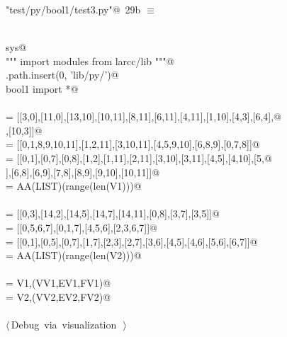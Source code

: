 \documentclass[11pt,oneside]{article}	%
\begin{document}
\begin{flushleft} \small \label{scrap37}
\protect{}\verb@"test/py/bool1/test3.py"@\nobreak\ {\footnotesize 29b }$\equiv$
\vspace{-1ex}
\begin{list}{}{} \item
\mbox{}\verb@@\\
\mbox{}\verb@import sys@\\
\mbox{}\verb@""" import modules from larcc/lib """@\\
\mbox{}\verb@sys.path.insert(0, 'lib/py/')@\\
\mbox{}\verb@from bool1 import *@\\
\mbox{}\verb@@\\
\mbox{} = [[3,0],[11,0],[13,10],[10,11],[8,11],[6,11],[4,11],[1,10],[4,3],[6,4],@\\
\mbox{}\verb@      [8,4],[10,3]]@\\
\mbox{} = [[0,1,8,9,10,11],[1,2,11],[3,10,11],[4,5,9,10],[6,8,9],[0,7,8]]@\\
\mbox{} = [[0,1],[0,7],[0,8],[1,2],[1,11],[2,11],[3,10],[3,11],[4,5],[4,10],[5,@\\
\mbox{}],[6,8],[6,9],[7,8],[8,9],[9,10],[10,11]]@\\
\mbox{} = AA(LIST)(range(len(V1)))@\\
\mbox{}\verb@@\\
\mbox{} = [[0,3],[14,2],[14,5],[14,7],[14,11],[0,8],[3,7],[3,5]]@\\
\mbox{} = [[0,5,6,7],[0,1,7],[4,5,6],[2,3,6,7]]@\\
\mbox{} = [[0,1],[0,5],[0,7],[1,7],[2,3],[2,7],[3,6],[4,5],[4,6],[5,6],[6,7]]@\\
\mbox{} = AA(LIST)(range(len(V2)))@\\
\mbox{}\verb@@\\
\mbox{} = V1,(VV1,EV1,FV1)@\\
\mbox{} = V2,(VV2,EV2,FV2)@\\
\mbox{}\verb@@\\
\mbox{}\verb@@\hbox{$\langle\,$Debug via visualization\nobreak\ {\footnotesize {}}$\,\rangle$}\verb@@\\
\mbox{}\verb@@{\NWsep}
\end{list}
\vspace{-2ex}
\end{flushleft}
\end{document}
